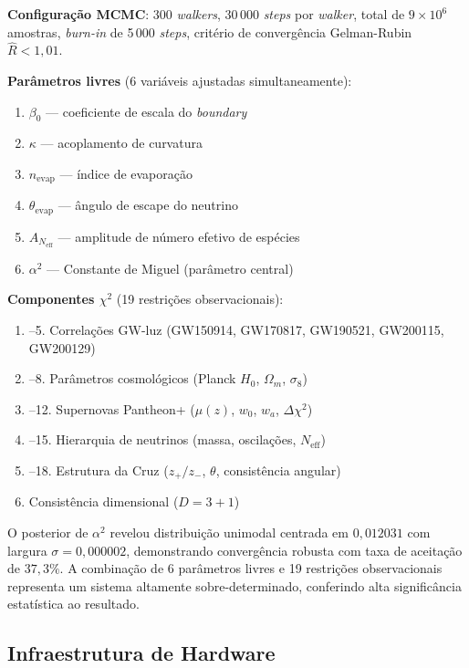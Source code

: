 \documentclass[12pt,a4paper,twoside]{article}
\newcommand{\alphaii}{\alpha^{2}}
\begin{document}
\textbf{Configura\c{c}\~ao MCMC}: 300 \textit{walkers}, 30\,000 \textit{steps} por \textit{walker}, total de $9 \times 10^6$ amostras, \textit{burn-in} de 5\,000 \textit{steps}, crit\'erio de converg\^encia Gelman-Rubin $\hat{R} < 1{,}01$.

\textbf{Par\^ametros livres} (6 vari\'aveis ajustadas simultaneamente):
\begin{enumerate}[nosep]
\item $\beta_0$ --- coeficiente de escala do \textit{boundary}
\item $\kappa$ --- acoplamento de curvatura
\item $n_{\text{evap}}$ --- \'indice de evapora\c{c}\~ao
\item $\theta_{\text{evap}}$ --- \^angulo de escape do neutrino
\item $A_{N_{\text{eff}}}$ --- amplitude de n\'umero efetivo de esp\'ecies
\item $\alphaii$ --- Constante de Miguel (par\^ametro central)
\end{enumerate}

\textbf{Componentes $\chi^2$} (19 restri\c{c}\~oes observacionais):
\begin{enumerate}[nosep]
\item--5. Correla\c{c}\~oes GW-luz (GW150914, GW170817, GW190521, GW200115, GW200129)
\item--8. Par\^ametros cosmol\'ogicos (Planck $H_0$, $\Omega_m$, $\sigma_8$)
\item--12. Supernovas Pantheon+ ($\mu(z)$, $w_0$, $w_a$, $\Delta\chi^2$)
\item--15. Hierarquia de neutrinos (massa, oscila\c{c}\~oes, $N_{\text{eff}}$)
\item--18. Estrutura da Cruz ($z_+/z_-$, $\theta$, consist\^encia angular)
\item Consist\^encia dimensional ($D = 3 + 1$)
\end{enumerate}

O posterior de $\alphaii$ revelou distribui\c{c}\~ao unimodal centrada em $0{,}012031$ com largura $\sigma = 0{,}000002$, demonstrando converg\^encia robusta com taxa de aceita\c{c}\~ao de $37{,}3\%$. A combina\c{c}\~ao de 6 par\^ametros livres e 19 restri\c{c}\~oes observacionais representa um sistema altamente sobre-determinado, conferindo alta signific\^ancia estat\'istica ao resultado.

\subsection{Infraestrutura de Hardware}
\end{document}
